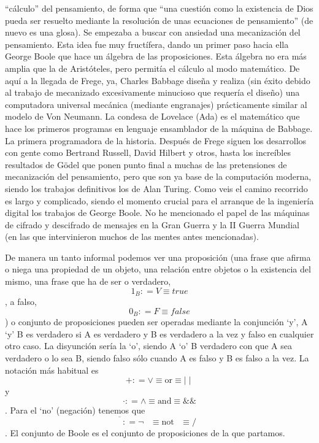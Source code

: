   ``cálculo'' del pensamiento, de forma que ``una cuestión como la
  existencia de Dios pueda ser resuelto mediante la resolución de unas
  ecuaciones de pensamiento'' (de nuevo es una glosa). Se empezaba a
  buscar con ansiedad una mecanización del pensamiento. Esta idea fue
  muy fructífera, dando un primer paso hacia ella George Boole que hace
  un ál\-gebra de las proposiciones. Esta álgebra no era más amplia que
  la de Aristóteles, pero permitía el cálculo al modo matemático. De
  aquí a la llegada de Frege, ya, Charles Babbage diseña y realiza (sin
  éxito debido al trabajo de mecanizado ex\-cesivamente minucioso que
  requería el diseño) una computadora universal me\-cánica (mediante
  engranajes) prácticamente similar al modelo de Von Neumann. La condesa
  de Lovelace (Ada) es el matemático que hace los primeros progra\-mas
  en lenguaje ensamblador de la máquina de Babbage. La primera
  programa\-dora de la historia. Después de Frege siguen los desarrollos
  con gente como Ber\-trand Russell, David Hilbert y otros, hasta los
  increíbles resultados de Gödel que ponen punto final a muchas de las
  pretensiones de mecanización del pensamiento, pero que son ya base de
  la computación moderna, siendo los trabajos definitivos los de Alan
  Turing. Como veis el camino recorrido es largo y complicado, siendo el
  momento crucial para el arranque de la ingeniería digital los trabajos
  de George Boole. No he mencionado el papel de las máquinas de cifrado
  y descifrado de mensajes en la Gran Guerra y la II Guerra Mundial (en
  las que intervinieron muchos de las mentes antes mencionadas).

  De manera un tanto informal podemos ver una proposición (una frase que
  afirma o niega una propiedad de un objeto, una relación entre objetos
  o la existencia del mismo, una frase que ha de ser o verdadero,
  \[1_{B}{{: = V} \equiv \mathbf{\mathit{true}}}\], a falso,
  \[0_{B}{{: = F} \equiv \mathbf{\mathit{false}}}\]) o conjunto de
  proposiciones pueden ser operadas mediante la conjunción `y', A `y' B
  es verdadero si A es verdadero y B es verdadero a la vez y falso en
  cualquier otro caso. La disyunción sería la `o', siendo A `o' B
  verdadero con que A sea verdadero o lo sea B, siendo falso sólo cuando
  A es falso y B es falso a la vez. La notación más habitual es
  \[{{+ {: = \vee}} \equiv \text{or}} \equiv {\mid \mid}\]y\[{{\cdot {: = \land}} \equiv \text{and}} \equiv {\&\&}\].
  Para el `no' (negación) tenemos
  que\[{{\overline{\phantom{A}}{: = {\neg\phantom{A}}}} \equiv \text{not}}{\phantom{A} \equiv {/\phantom{A}}}\].
  El conjunto de Boole es el conjunto de proposiciones de la que
  partamos.

